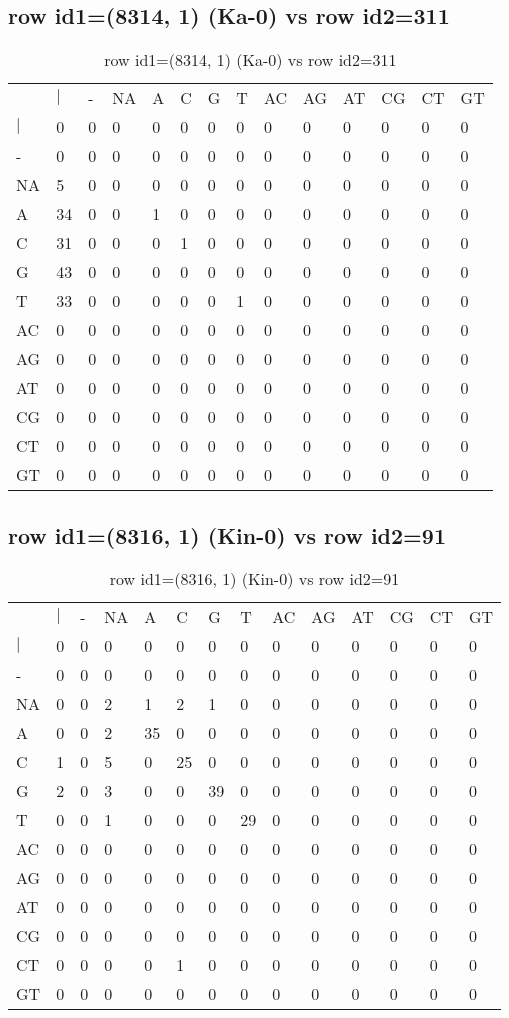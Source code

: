 \subsection{row id1=(8314, 1) (Ka-0) vs row id2=311}
\begin{center}
\begin{longtable}{|l|l|l|l|l|l|l|l|l|l|l|l|l|l|}
\caption{row id1=(8314, 1) (Ka-0) vs row id2=311} \label{table_dm302}\\
\hline
\\
\hline
&$|$&-&NA&A&C&G&T&AC&AG&AT&CG&CT&GT\\
$|$&0&0&0&0&0&0&0&0&0&0&0&0&0\\
-&0&0&0&0&0&0&0&0&0&0&0&0&0\\
NA&5&0&0&0&0&0&0&0&0&0&0&0&0\\
A&34&0&0&1&0&0&0&0&0&0&0&0&0\\
C&31&0&0&0&1&0&0&0&0&0&0&0&0\\
G&43&0&0&0&0&0&0&0&0&0&0&0&0\\
T&33&0&0&0&0&0&1&0&0&0&0&0&0\\
AC&0&0&0&0&0&0&0&0&0&0&0&0&0\\
AG&0&0&0&0&0&0&0&0&0&0&0&0&0\\
AT&0&0&0&0&0&0&0&0&0&0&0&0&0\\
CG&0&0&0&0&0&0&0&0&0&0&0&0&0\\
CT&0&0&0&0&0&0&0&0&0&0&0&0&0\\
GT&0&0&0&0&0&0&0&0&0&0&0&0&0\\
\hline
\end{longtable}
\end{center}

\subsection{row id1=(8316, 1) (Kin-0) vs row id2=91}
\begin{center}
\begin{longtable}{|l|l|l|l|l|l|l|l|l|l|l|l|l|l|}
\caption{row id1=(8316, 1) (Kin-0) vs row id2=91} \label{table_dm304}\\
\hline
\\
\hline
&$|$&-&NA&A&C&G&T&AC&AG&AT&CG&CT&GT\\
$|$&0&0&0&0&0&0&0&0&0&0&0&0&0\\
-&0&0&0&0&0&0&0&0&0&0&0&0&0\\
NA&0&0&2&1&2&1&0&0&0&0&0&0&0\\
A&0&0&2&35&0&0&0&0&0&0&0&0&0\\
C&1&0&5&0&25&0&0&0&0&0&0&0&0\\
G&2&0&3&0&0&39&0&0&0&0&0&0&0\\
T&0&0&1&0&0&0&29&0&0&0&0&0&0\\
AC&0&0&0&0&0&0&0&0&0&0&0&0&0\\
AG&0&0&0&0&0&0&0&0&0&0&0&0&0\\
AT&0&0&0&0&0&0&0&0&0&0&0&0&0\\
CG&0&0&0&0&0&0&0&0&0&0&0&0&0\\
CT&0&0&0&0&1&0&0&0&0&0&0&0&0\\
GT&0&0&0&0&0&0&0&0&0&0&0&0&0\\
\hline
\end{longtable}
\end{center}

